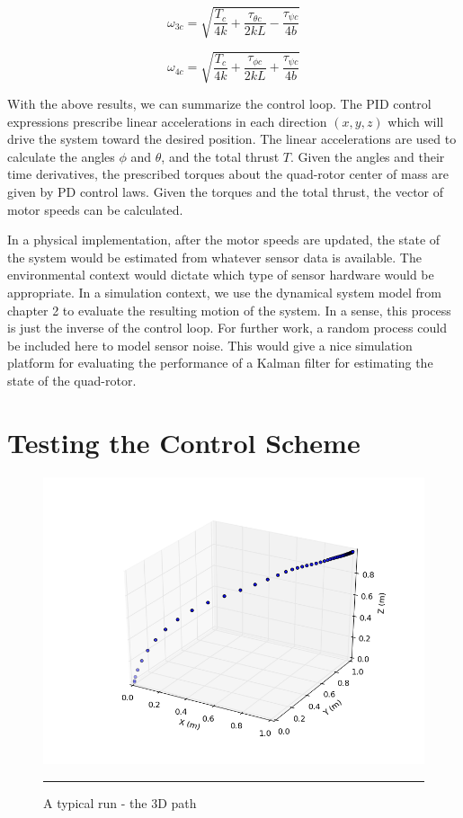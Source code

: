 \begin{equation}
    \omega_{3c} = \sqrt{ \frac{T_c}{4 k} + \frac{ \tau_{\theta c}}{2 k L} - \frac{ \tau_{\psi c} }{4 b } } 
\end{equation}

\begin{equation}
    \omega_{4c} = \sqrt{ \frac{T_c}{4 k} + \frac{ \tau_{\phi c}}{2 k L}   + \frac{ \tau_{\psi c} }{4 b } } 
\end{equation}


With the above results, we can summarize the control loop. The PID control expressions prescribe linear accelerations in each direction $(x,y,z)$ which will drive the system toward the desired position. The linear accelerations are used to calculate the angles $\phi$ and $\theta$, and the total thrust $T$. Given the angles and their time derivatives, the prescribed torques about the quad-rotor center of mass are given by PD control laws. Given the torques and the total thrust, the vector of motor speeds can be calculated.

In a physical implementation, after the motor speeds are updated, the state of the system would be estimated from whatever sensor data is available. The environmental context would dictate which type of sensor hardware would be appropriate. In a simulation context, we use the dynamical system model from chapter 2 to evaluate the resulting motion of the system. In a sense, this process is just the inverse of the control loop. For further work, a random process could be included here to model sensor noise. This would give a nice simulation platform for evaluating the performance of a Kalman filter for estimating the state of the quad-rotor.  

\section{Testing the Control Scheme}



\begin{figure}[htbp]
	\centering
		\includegraphics[width=\textwidth]{Figures/typical_run_time_3D_path.png}
		\rule{35em}{0.5pt}
	\caption[typical run 3D path]{A typical run - the 3D path}
	\label{fig:typical run 3D path}
\end{figure}

